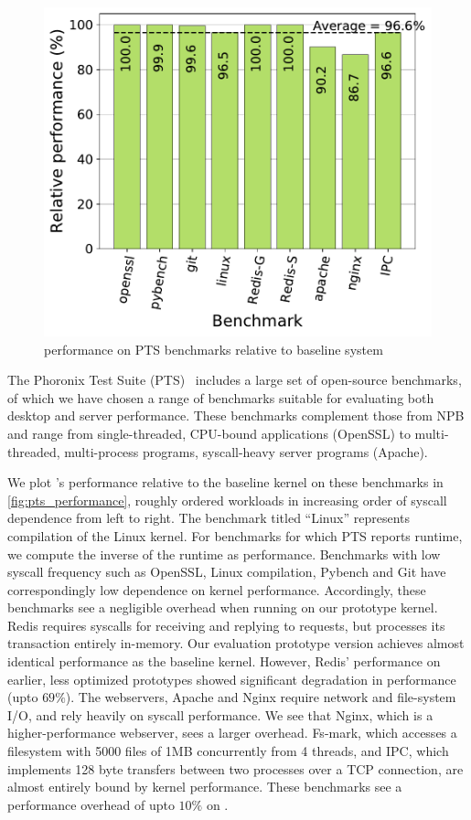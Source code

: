 \documentclass[letterpaper,twocolumn,10pt, anonymous]{article}
\begin{document}
\begin{figure}[]
  \includegraphics[width=\linewidth]{img/pts_performance.pdf}
  \caption{\tiktok performance on PTS benchmarks relative to baseline system}
  \label{fig:pts_performance}
\end{figure}

The Phoronix Test Suite (PTS)~\cite{pts} includes a large set of 
open-source benchmarks, of which we have chosen a range of benchmarks 
suitable for evaluating both desktop and server performance.
These benchmarks complement those from NPB and range from single-threaded, 
CPU-bound applications (OpenSSL) to multi-threaded, multi-process 
programs, syscall-heavy server programs (Apache).

We plot \tiktok's performance relative to the baseline kernel on
these benchmarks in \autoref{fig:pts_performance}, roughly ordered 
workloads in increasing order of syscall dependence from left to right.
The benchmark titled ``Linux'' represents compilation of the Linux kernel.
For benchmarks for which PTS reports runtime, we compute the inverse 
of the runtime as performance.
Benchmarks with low syscall frequency such as OpenSSL, Linux compilation, 
Pybench and Git have correspondingly low dependence on kernel performance.
Accordingly, these benchmarks see a negligible overhead when running 
on our prototype kernel.
Redis requires syscalls for receiving and replying to requests, but 
processes its transaction entirely in-memory. 
Our evaluation prototype version achieves almost identical performance
as the baseline kernel.
However, Redis' performance on earlier, less optimized prototypes showed
significant degradation in performance (upto $69\%$).
The webservers, Apache and Nginx require network and file-system I/O, 
and rely heavily on syscall performance. 
We see that Nginx, which is a higher-performance webserver, sees a larger
overhead.
Fs-mark, which accesses a filesystem with 5000 files of 1MB concurrently
from 4 threads, and IPC, which implements 128 byte transfers between 
two processes over a TCP connection, are almost entirely bound by kernel 
performance. 
These benchmarks see a performance overhead of upto $10\%$ on \tiktok.
\end{document}

